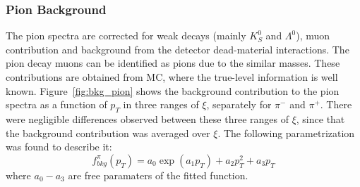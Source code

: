 \subsubsection{Pion Background}\label{section:star_background_pion}
The pion spectra are corrected for weak decays (mainly $K^0_S$ and $\Lambda^0$), muon contribution and background from the   detector dead-material interactions. The pion decay muons can be identified as pions due to the similar masses. These contributions are obtained from MC, where the true-level information is well known. Figure~\ref{fig:bkg_pion} shows the background contribution to the pion spectra as a function of $p_T$ in three ranges of $\xi$, separately for $\pi^-$ and $\pi^+$.  There were   negligible differences  observed between these  three ranges of $\xi$, since that the background contribution was averaged over $\xi$. The following parametrization was found to describe it:
\begin{equation}
f_{bkg}^{\pi}\left(p_T\right)=a_0\exp(a_1p_T)+a_2p_T^2+a_3p_T
\end{equation}
where $a_0-a_3$ are free paramaters of the fitted function.

